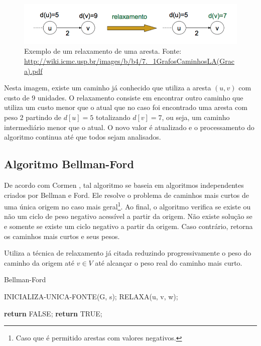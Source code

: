 \documentclass[12pt]{article}
\begin{document}
\begin{figure}[H]
  \centering
    \includegraphics[width=1\textwidth]{img/relaxamento.png}
  \caption{Exemplo de um relaxamento de uma aresta. Fonte: \protect\url{http://wiki.icmc.usp.br/images/b/b4/7._1GrafosCaminhosLA(Graca).pdf}}
  \label{fig:relaxamento}
\end{figure}

Nesta imagem, existe um caminho já conhecido que utiliza a aresta $(u,v)$ com custo de 9 unidades. O relaxamento consiste em encontrar outro caminho que utiliza um custo menor que o atual que no caso foi encontrado uma aresta com peso $2$ partindo de $d[u]=5$ totalizando $d[v]=7$, ou seja, um caminho intermediário menor que o atual. O novo valor é atualizado e o processamento do algoritmo continua até que todos sejam analisados.

\subsection{Algoritmo Bellman-Ford}

De acordo com Cormen \cite{cormen2002algoritmos}, tal algoritmo se baseia em algoritmos independentes
criados por Bellman e Ford. Ele resolve o problema de caminhos mais curtos de uma única origem no caso mais geral\footnote{Caso que é permitido arestas com valores negativos.}. Ao final, o algoritmo verifica se existe ou não um ciclo de peso negativo acessível a partir da origem. Não existe solução se e somente se existe um ciclo negativo a partir da origem. Caso contrário, retorna os caminhos mais curtos e seus pesos.

Utiliza a técnica de relaxamento já citada reduzindo progressivamente o peso do caminho da origem até $v \in V$ até alcançar o peso real do caminho mais curto.


\begin{algorithm}[H]
\caption{Bellman-Ford}\label{alg:d}
\begin{algorithmic}[1]
	\State INICIALIZA-UNICA-FONTE(G, s);
	      \State RELAXA(u, v, w);
      \EndFor
    \EndFor
    
	      \State \textbf{return} FALSE;
      \EndIf
    \EndFor
    \State \textbf{return} TRUE;
\EndProcedure
\end{algorithmic}
\end{algorithm}
\end{document}
